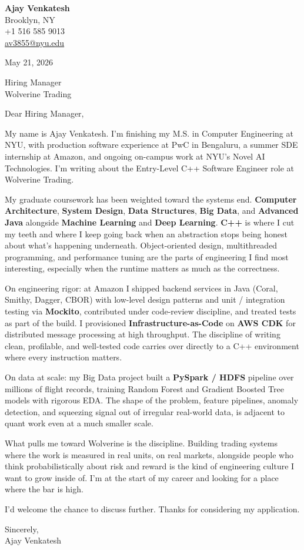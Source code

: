 \documentclass[letterpaper,11pt]{article}
\begin{document}
\begin{flushleft}
\textbf{\large Ajay Venkatesh} \\
Brooklyn, NY \\
+1 516 585 9013 \\
\href{mailto:av3855@nyu.edu}{av3855@nyu.edu}
\end{flushleft}
\vspace{10pt}
May 21, 2026
\vspace{6pt}

Hiring Manager \\
Wolverine Trading

\vspace{10pt}

Dear Hiring Manager,

My name is Ajay Venkatesh. I'm finishing my M.S. in Computer Engineering at NYU, with production software experience at PwC in Bengaluru, a summer SDE internship at Amazon, and ongoing on-campus work at NYU's Novel AI Technologies. I'm writing about the Entry-Level C++ Software Engineer role at Wolverine Trading.

My graduate coursework has been weighted toward the systems end. \textbf{Computer Architecture}, \textbf{System Design}, \textbf{Data Structures}, \textbf{Big Data}, and \textbf{Advanced Java} alongside \textbf{Machine Learning} and \textbf{Deep Learning}. \textbf{C++} is where I cut my teeth and where I keep going back when an abstraction stops being honest about what's happening underneath. Object-oriented design, multithreaded programming, and performance tuning are the parts of engineering I find most interesting, especially when the runtime matters as much as the correctness.

On engineering rigor: at Amazon I shipped backend services in Java (Coral, Smithy, Dagger, CBOR) with low-level design patterns and unit / integration testing via \textbf{Mockito}, contributed under code-review discipline, and treated tests as part of the build. I provisioned \textbf{Infrastructure-as-Code} on \textbf{AWS CDK} for distributed message processing at high throughput. The discipline of writing clean, profilable, and well-tested code carries over directly to a C++ environment where every instruction matters.

On data at scale: my Big Data project built a \textbf{PySpark / HDFS} pipeline over millions of flight records, training Random Forest and Gradient Boosted Tree models with rigorous EDA. The shape of the problem, feature pipelines, anomaly detection, and squeezing signal out of irregular real-world data, is adjacent to quant work even at a much smaller scale.

What pulls me toward Wolverine is the discipline. Building trading systems where the work is measured in real units, on real markets, alongside people who think probabilistically about risk and reward is the kind of engineering culture I want to grow inside of. I'm at the start of my career and looking for a place where the bar is high.

I'd welcome the chance to discuss further. Thanks for considering my application.

\vspace{12pt}
Sincerely, \\
Ajay Venkatesh
\end{document}
